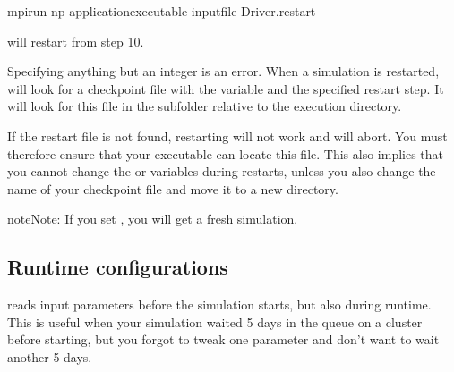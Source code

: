 \documentclass[letterpaper,10pt,english]{sphinxmanual}
\begin{document}
\begin{sphinxVerbatim}[commandchars=\\\{\},formatcom=\scriptsize]
mpirun \PYGZhy{}np  \PYGZlt{}application\PYGZus{}executable\PYGZgt{} \PYGZlt{}input\PYGZus{}file\PYGZgt{} Driver.restart
\end{sphinxVerbatim}

will restart from step 10.

Specifying anything but an integer is an error.
When a simulation is restarted,  will look for a checkpoint file with the  variable and the specified restart step.
It will look for this file in the subfolder  relative to the execution directory.

If the restart file is not found, restarting will not work and  will abort.
You must therefore ensure that your executable can locate this file.
This also implies that you cannot change the  or  variables during restarts, unless you also change the name of your checkpoint file and move it to a new directory.

\begin{sphinxadmonition}{note}{Note:}
If you set , you will get a fresh simulation.
\end{sphinxadmonition}


\subsection{Run\sphinxhyphen{}time configurations}
\label{\detokenize{Base/Control:run-time-configurations}}\label{\detokenize{Base/Control:chap-runtimeconfig}}
 reads input parameters before the simulation starts, but also during run\sphinxhyphen{}time.
This is useful when your simulation waited 5 days in the queue on a cluster before starting, but you forgot to tweak one parameter and don’t want to wait another 5 days.
\end{document}
